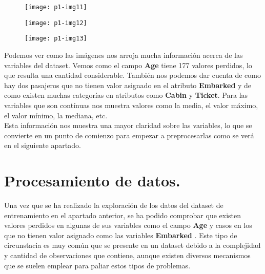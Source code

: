 \documentclass[10pt]{article}
\begin{document}
\begin{figure}[H]
	\begin{center}
 		\texttt{[image: p1-img11]}
	\end{center} 
\end{figure}

\begin{figure}[H]
	\begin{center}
 		\texttt{[image: p1-img12]}
	\end{center} 
\end{figure}

\begin{figure}[H]
	\begin{center}
 		\texttt{[image: p1-img13]}
	\end{center} 
\end{figure}


Podemos ver como las imágenes nos arroja mucha información acerca de las variables del dataset. Vemos como el campo \textbf{Age} tiene 177 valores perdidos, lo que resulta una cantidad considerable. También nos podemos dar cuenta de como hay dos pasajeros que no tienen valor asignado en el atributo \textbf{Embarked} y de como existen muchas categorías en atributos como \textbf{Cabin} y \textbf{Ticket}. Para las variables que son contínuas nos muestra valores como la media, el valor máximo, el valor mínimo, la mediana, etc.\\

Esta información nos muestra una mayor claridad sobre las variables, lo que se convierte en un punto de comienzo para empezar a preprocesarlas como se verá en el siguiente apartado.


\section{Procesamiento de datos.} 
Una vez que se ha realizado la exploración de los datos del dataset de entrenamiento en el apartado anterior, se ha podido comprobar que existen valores perdidos en algunas de sus variables como el campo \textbf{Age} y casos en los que no tienen valor asignado como las variables \textbf{Embarked} . Este tipo de circunstacia es muy común que se presente en un dataset debido a la complejidad y cantidad de observaciones que contiene, aunque existen diversos mecanismos que se suelen emplear para paliar estos tipos de problemas. \\
\end{document}
